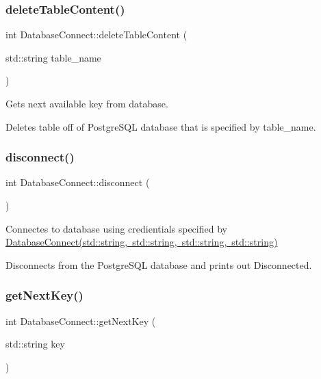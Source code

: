 \subsubsection{\texorpdfstring{delete\+Table\+Content()}{deleteTableContent()}}
{\footnotesize\ttfamily int Database\+Connect\+::delete\+Table\+Content (\begin{DoxyParamCaption}\item[{std\+::string}]{table\+\_\+name }\end{DoxyParamCaption})}



Gets next available key from database. 

Deletes table off of Postgre\+S\+QL database that is specified by table\+\_\+name. \mbox{\label{classDatabaseConnect_a1a276c7ee1c41f1ba38ff6e31f804f83}} 
\subsubsection{\texorpdfstring{disconnect()}{disconnect()}}
{\footnotesize\ttfamily int Database\+Connect\+::disconnect (\begin{DoxyParamCaption}{ }\end{DoxyParamCaption})}



Connectes to database using credientials specified by \mbox{\hyperlink{classDatabaseConnect_ad4273735005641691826765240a1dfb8}{Database\+Connect(std\+::string, std\+::string, std\+::string, std\+::string)}} 

Disconnects from the Postgre\+S\+QL database and prints out \textquotesingle{}Disconnected\textquotesingle{}. \mbox{\label{classDatabaseConnect_a09195941dbccc3a9ae41edc9440f0513}} 
\subsubsection{\texorpdfstring{get\+Next\+Key()}{getNextKey()}}
{\footnotesize\ttfamily int Database\+Connect\+::get\+Next\+Key (\begin{DoxyParamCaption}\item[{std\+::string}]{key }\end{DoxyParamCaption})}


